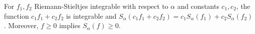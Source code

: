 For $f_1, f_2$ Riemann-Stieltjes integrable with respect to $\alpha$ and constants $c_1, c_2$, the function $c_1 f_1 + c_2 f_2$ is integrable and $S_{\alpha}(c_1 f_1 + c_2 f_2) = c_1 S_{\alpha}(f_1) + c_2 S_{\alpha}(f_2)$. Moreover, $f \geq 0$ implies $S_{\alpha}(f) \geq 0$.

